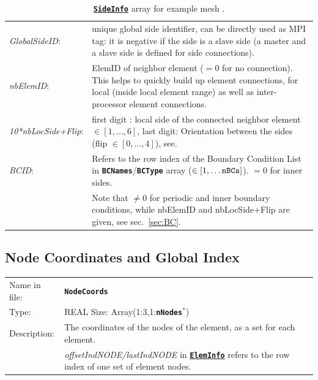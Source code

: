 \documentclass[a4paper,headsepline]{scrreprt}
\newcommand\rf[1]{\prettyref{#1}}
\newcommand\ttbf[1]{\texttt{\textbf{#1}}}
\newcommand\ElemInfo{\hyperlink{ElemInfo}{\ttbf{ElemInfo}}\xspace}
\newcommand\SideInfo{\hyperlink{SideInfo}{\ttbf{SideInfo}}\xspace}
\newcommand\BCNames{\ttbf{BCNames}\xspace}
\newcommand\BCType{\ttbf{BCType}\xspace}
\newcommand\nNodes{\ttbf{nNodes}\xspace}
\begin{document}
\begin{table}[h!]
\begin{tabularx}{1.0\textwidth}{|lX|}
%
\emph{GlobalSideID}:    & unique global side identifier, can be directly used as MPI tag: it is negative if the side is a slave side (a master and a slave side is defined for side connections). \\
%
\emph{nbElemID}:        & ElemID of neighbor element ($=0$ for no connection). This helps to quickly build up element connections, for local (inside local element range) as well as inter-processor element connections. \\
\emph{10*nbLocSide+Flip}:  &  first digit : local side of the connected neighbor element$\in[1,\dots,6]$, last digit: Orientation between the sides (flip $\in [0,\dots,4]$), see\rf{sec:flip}. \\
%
\emph{BCID}:            & Refers to the row index of the Boundary Condition List in \BCNames/\BCType array ($\in[1,\dots\text{\texttt{nBCs}}]$). $=0$ for inner sides. \\
                        & Note that $\neq 0$ for periodic and inner boundary conditions, while nbElemID and nbLocSide+Flip are given, see sec.~\ref{sec:BC}.     \\\hline
\end{tabularx}
\caption{\protect\SideInfo array for example mesh \rf{fig:exmesh}.}
\end{table}



\newpage

\hypertarget{NodeInfo}{\subsection{Node Coordinates and Global Index}}
\label{sec:NodeCoords}

\begin{tabularx}{1.0\textwidth}{lX}
Name in  file: & \textbf{\texttt{NodeCoords}}\\
Type:         & REAL \quad Size: Array(1:3,1:\nNodes$^*$) \\
Description:  & The coordinates of the nodes of the element, as a set for each element.  \\
              & \emph{offsetIndNODE/lastIndNODE} in \ElemInfo refers to the row index of one set of element nodes. \\
\end{tabularx}
\end{document}
